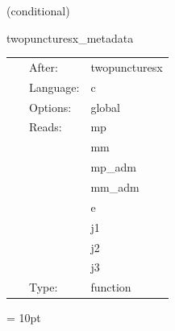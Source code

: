    (conditional) 

\hspace{5mm} twopuncturesx\_metadata 

\hspace{5mm}{\it output twopuncturesx metadata } 


\hspace{5mm}

 \begin{tabular*}{160mm}{cll} 
~ & After:  & twopuncturesx \\ 
~ & Language:  & c \\ 
~ & Options:  & global \\ 
~ & Reads:  & mp \\ 
~& ~ &mm\\ 
~& ~ &mp\_adm\\ 
~& ~ &mm\_adm\\ 
~& ~ &e\\ 
~& ~ &j1\\ 
~& ~ &j2\\ 
~& ~ &j3\\ 
~ & Type:  & function \\ 
\end{tabular*} 



\vspace{5mm}\parskip = 10pt 

